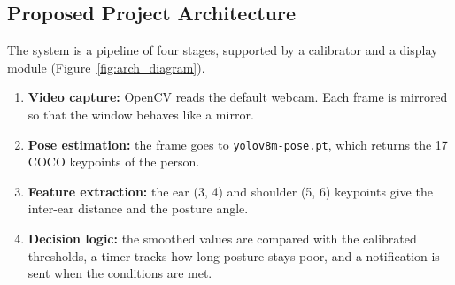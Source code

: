 ﻿\documentclass[12pt,a4paper]{article}
\begin{document}
\subsection{Proposed Project Architecture}
The system is a pipeline of four stages, supported by a calibrator and a display module
(Figure~\ref{fig:arch_diagram}).
\begin{enumerate}
    \item \textbf{Video capture:} OpenCV reads the default webcam. Each frame is mirrored
          so that the window behaves like a mirror.
    \item \textbf{Pose estimation:} the frame goes to \texttt{yolov8m-pose.pt}, which
          returns the 17 COCO keypoints of the person.
    \item \textbf{Feature extraction:} the ear (3, 4) and shoulder (5, 6) keypoints give
          the inter-ear distance and the posture angle.
    \item \textbf{Decision logic:} the smoothed values are compared with the calibrated
          thresholds, a timer tracks how long posture stays poor, and a notification is
          sent when the conditions are met.
\end{enumerate}
\end{document}
